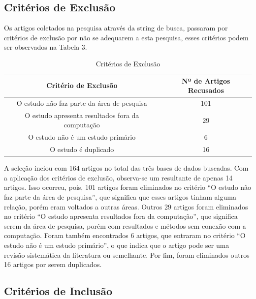 \subsection{Critérios de Exclusão}

Os artigos coletados na pesquisa através da string de busca, passaram por critérios de exclusão por não se adequarem a esta pesquisa, esses critérios podem ser observados na Tabela 3. 

\begin{table}[!htb]
	\centering
	\caption{Critérios de Exclusão}
	\label{tbl:exclusao}
	\begin{tabular}{|c|c|}
		\hline
		\textbf{Critério de Exclusão}                    & \textbf{Nº de Artigos Recusados} \\ \hline
		O estudo não faz parte da área de pesquisa       & 101                               \\ \hline
		O estudo apresenta resultados fora da computação & 29                                \\ \hline
		O estudo não é um estudo primário               & 6                                 \\ \hline
		O estudo é duplicado                              & 16                                \\ \hline
	\end{tabular}
	\vspace{6pt}
\end{table}

A seleção inciou com 164 artigos no total das três bases de dados buscadas. Com a aplicação dos critérios de exclusão, observa-se um resultante de apenas 14 artigos. Isso ocorreu, pois, 101 artigos foram eliminados no critério ``O estudo não faz parte da área de pesquisa'', que significa que esses artigos tinham alguma relação, porém eram voltados a outras áreas. Outros 29 artigos foram eliminados no critério ``O estudo apresenta resultados fora da computação'', que significa serem da área de pesquisa, porém com resultados e métodos sem conexão com a computação. Foram também encontrados 6 artigos, que entraram no critério ``O estudo não é um estudo primário'', o que indica que o artigo pode ser uma revisão sistemática da literatura ou semelhante. Por fim, foram eliminados outros 16 artigos por serem duplicados.

\subsection{Critérios de Inclusão}

